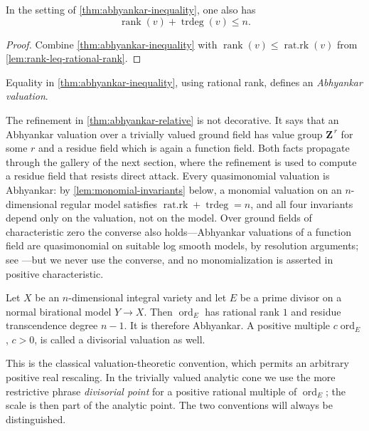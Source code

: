 \begin{corollary}\label{cor:rank-plus-trdeg}
In the setting of \cref{thm:abhyankar-inequality}, one also has
\[
 \operatorname{rank}(v)+\operatorname{trdeg}(v)\leq n .
\]
\end{corollary}
\begin{proof}
Combine \cref{thm:abhyankar-inequality} with
$\operatorname{rank}(v)\leq\operatorname{rat.rk}(v)$ from
\cref{lem:rank-leq-rational-rank}.
\end{proof}

Equality in \cref{thm:abhyankar-inequality}, using rational rank,
defines an \emph{Abhyankar valuation}.

The refinement in \cref{thm:abhyankar-relative} is not decorative. It
says that an Abhyankar valuation over a trivially valued ground field
has value group $\mathbf Z^{\,r}$ for some $r$ and a residue field
which is again a function field. Both facts propagate through the gallery of the next section, where the refinement
is used to compute a residue field that resists direct attack. Every
quasimonomial valuation is Abhyankar: by
\cref{lem:monomial-invariants} below, a monomial valuation on an
$n$-dimensional regular model satisfies
$\operatorname{rat.rk}+\operatorname{trdeg}=n$, and all four invariants
depend only on the valuation, not on the model. Over ground fields of
characteristic zero the converse also holds---Abhyankar valuations of a
function field are quasimonomial on suitable log smooth models, by
resolution arguments; see \cite{JM12}---but we never use the converse,
and no monomialization is asserted in positive characteristic.

\begin{example}\label{ex:divisorial-valuations}
Let $X$ be an $n$-dimensional integral variety and let $E$ be a prime divisor
on a normal birational model $Y\to X$. Then
$\operatorname{ord}_E$ has rational rank $1$ and residue transcendence degree
$n-1$. It is therefore Abhyankar. A positive multiple
$c\operatorname{ord}_E$, $c>0$, is called a divisorial valuation as well.
\end{example}

This is the classical valuation-theoretic convention, which permits an
arbitrary positive real rescaling.  In the trivially valued analytic cone
we use the more restrictive phrase \emph{divisorial point} for a positive
rational multiple of $\operatorname{ord}_E$; the scale is then part of
the analytic point.  The two conventions will always be distinguished.

